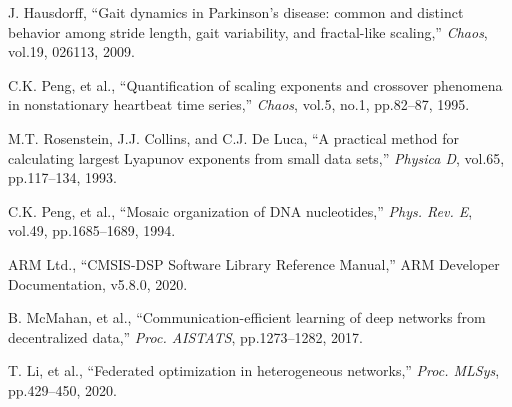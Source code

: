\documentclass[paper]{ieice}
\begin{document}
\begin{thebibliography}{99}
J. Hausdorff, ``Gait dynamics in Parkinson's disease: common and distinct behavior among stride length, gait variability, and fractal-like scaling,'' \textit{Chaos}, vol.19, 026113, 2009.

C.K. Peng, et al., ``Quantification of scaling exponents and crossover phenomena in nonstationary heartbeat time series,'' \textit{Chaos}, vol.5, no.1, pp.82--87, 1995.


M.T. Rosenstein, J.J. Collins, and C.J. De Luca, ``A practical method for calculating largest Lyapunov exponents from small data sets,'' \textit{Physica D}, vol.65, pp.117--134, 1993.

C.K. Peng, et al., ``Mosaic organization of DNA nucleotides,'' \textit{Phys. Rev. E}, vol.49, pp.1685--1689, 1994.

ARM Ltd., ``CMSIS-DSP Software Library Reference Manual,'' ARM Developer Documentation, v5.8.0, 2020.

B. McMahan, et al., ``Communication-efficient learning of deep networks from decentralized data,'' \textit{Proc. AISTATS}, pp.1273--1282, 2017.

T. Li, et al., ``Federated optimization in heterogeneous networks,'' \textit{Proc. MLSys}, pp.429--450, 2020.

\end{thebibliography}
\end{document}
